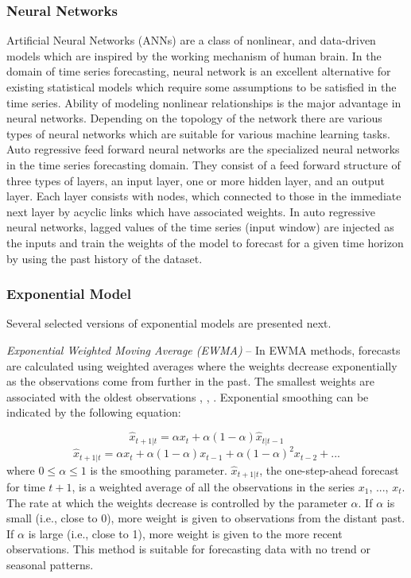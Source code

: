 \subsubsection{Neural Networks}
Artificial Neural Networks (ANNs) are a class of nonlinear, and data-driven models which are inspired by the working mechanism of human brain. In the domain of time series forecasting, neural network is an excellent alternative for existing statistical models which require some assumptions to be satisfied in the time series. Ability of modeling nonlinear relationships is the major advantage in neural networks. Depending on the topology of the network there are various types of neural networks which are suitable for various machine learning tasks. Auto regressive feed forward neural networks \cite{Forecasting_OTexts} are the specialized neural networks in the time series forecasting domain. They consist of a feed forward structure of three types of layers, an input layer, one or more hidden layer, and an output layer. Each layer consists with nodes, which connected to those in the immediate next layer by acyclic links which have associated weights. In auto regressive neural networks, lagged values of the time series (input window) are injected as the inputs and train the weights of the model to forecast for a given time horizon by using the past history of the dataset. 

\subsubsection{Exponential Model}
Several selected versions of exponential models are presented next.

\noindent
\textit{Exponential Weighted Moving Average (EWMA)} --
In EWMA methods, forecasts are calculated using weighted averages where the weights decrease exponentially as the observations come from further in the past. The smallest weights are associated with the oldest observations \cite{Forecasting_OTexts}, \cite{STAT510}, \cite{StatSoft}. Exponential smoothing can be indicated by the following equation:

	$$\hat{x}_{t+1|t}=\alpha x_t +\alpha(1-\alpha)\hat{x}_{t|t-1}$$
	$$\hat{x}_{t+1|t}=\alpha x_t +\alpha(1-\alpha)x_{t-1}+\alpha(1-\alpha)^2x_{t-2}+...$$
where $0\leq \alpha \leq 1$ is the smoothing parameter. $\hat{x}_{t+1|t}$, the one-step-ahead forecast for time $t+1$, is a weighted average of all the observations in the series $x_1$, ..., $x_t$. The rate at which the weights decrease is controlled by the parameter $\alpha$. If $\alpha$ is small (i.e., close to 0), more weight is given to observations from the distant past. If $\alpha$ is large (i.e., close to 1), more weight is given to the more recent observations. This method is suitable for forecasting data with no trend or seasonal patterns.

